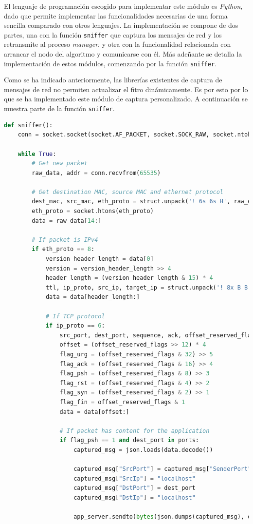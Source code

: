 El lenguaje de programación escogido para implementar este módulo es \textit{Python}\cite{python}, dado que permite implementar las funcionalidades necesarias de una forma sencilla comparado con otros lenguajes. La implementación se compone de dos partes, una con la función \texttt{sniffer} que captura los mensajes de red y los retransmite al proceso \textit{manager}, y otra con la funcionalidad relacionada con arrancar el nodo del algoritmo y comunicarse con él. Más adeñante se detalla la implementación de estos módulos, comenzando por la función \texttt{sniffer}.

Como se ha indicado anteriormente, las librerías existentes de captura de mensajes de red no permiten actualizar el fitro dinámicamente. Es por esto por lo que se ha implementado este módulo de captura personalizado. A continuación se muestra parte de la función \texttt{sniffer}.

\begin{lstlisting}[language=Python]
def sniffer():
    conn = socket.socket(socket.AF_PACKET, socket.SOCK_RAW, socket.ntohs(3))
    
    while True:
        # Get new packet
        raw_data, addr = conn.recvfrom(65535)
        
        # Get destination MAC, source MAC and ethernet protocol
        dest_mac, src_mac, eth_proto = struct.unpack('! 6s 6s H', raw_data[:14])
        eth_proto = socket.htons(eth_proto)
        data = raw_data[14:]

        # If packet is IPv4
        if eth_proto == 8:
            version_header_length = data[0]
            version = version_header_length >> 4
            header_length = (version_header_length & 15) * 4
            ttl, ip_proto, src_ip, target_ip = struct.unpack('! 8x B B 2x 4s 4s', data[:20])
            data = data[header_length:]

            # If TCP protocol
            if ip_proto == 6:
                src_port, dest_port, sequence, ack, offset_reserved_flags = struct.unpack('! H H L L H', data[:14])
                offset = (offset_reserved_flags >> 12) * 4
                flag_urg = (offset_reserved_flags & 32) >> 5
                flag_ack = (offset_reserved_flags & 16) >> 4
                flag_psh = (offset_reserved_flags & 8) >> 3
                flag_rst = (offset_reserved_flags & 4) >> 2
                flag_syn = (offset_reserved_flags & 2) >> 1
                flag_fin = offset_reserved_flags & 1
                data = data[offset:]

                # If packet has content for the application
                if flag_psh == 1 and dest_port in ports:
                    captured_msg = json.loads(data.decode())

                    captured_msg["SrcPort"] = captured_msg["SenderPort"]
                    captured_msg["SrcIp"] = "localhost"
                    captured_msg["DstPort"] = dest_port
                    captured_msg["DstIp"] = "localhost"

                    app_server.sendto(bytes(json.dumps(captured_msg), encoding='utf-8'), manager_addr)
\end{lstlisting}

